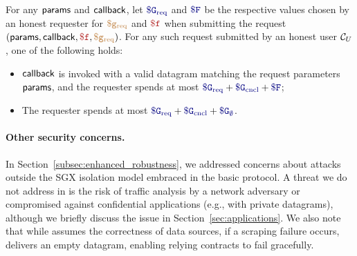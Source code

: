 \begin{theorem}
\label{thm:fair-expenditure}
For any ${\sf params}$ and ${\sf callback}$,
let $\constgasrequest$ and $\consthonestfee$ be the respective values chosen by an honest requester for $\textcolor{brown}{\tt \$g_\text{req}}$ and $\fee$
when submitting the request $(\dgform, \dgcallback, \fee, \gasrequest)$.
For any such request submitted by an honest user $\reqcont$, one of the following holds:
\begin{itemize}
  \setlength{\itemsep}{2pt}
  \setlength{\parskip}{0pt}
  \setlength{\parsep}{0pt}
  \item ${\sf callback}$ is invoked with a valid datagram matching the request parameters ${\sf params}$,
    and the requester spends at most $\constgasrequest + \constgasinvokecancel + \consthonestfee$;

  \item The requester spends at most $\constgasrequest + \constgasinvokecancel + \constgascancel$.
\end{itemize}
\end{theorem}





\paragraph{Other security concerns.} In Section~\ref{subsec:enhanced_robustness}, we addressed concerns about attacks outside the SGX isolation model embraced in the basic \tc protocol. A threat we do not address in \tc is the risk of traffic analysis by a network adversary or compromised \medname against confidential applications (e.g., with private datagrams), although we briefly discuss the issue in Section~\ref{sec:applications}. We also note that while \tc assumes the correctness of data sources, if a scraping failure occurs, \tc delivers an empty datagram, enabling relying contracts to fail gracefully.
